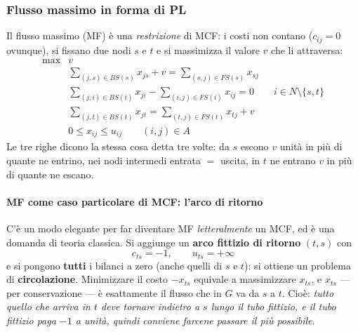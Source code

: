 \documentclass[12pt]{extarticle} %
\begin{document}
\subsubsection{Flusso massimo in forma di PL}
Il flusso massimo (MF) è una \emph{restrizione} di MCF: i costi non contano ($c_{ij}=0$ ovunque), si fissano due nodi $s$ e $t$ e si massimizza il valore $v$ che li attraversa:
\[
\begin{array}{ll}
\max & v \\
     & \displaystyle\sum_{(j,s)\in BS(s)} x_{js} + v = \sum_{(s,j)\in FS(s)} x_{sj} \\[2mm]
     & \displaystyle\sum_{(j,i)\in BS(i)} x_{ji} - \sum_{(i,j)\in FS(i)} x_{ij} = 0 \qquad i \in N \setminus\{s,t\}\\[2mm]
     & \displaystyle\sum_{(j,t)\in BS(t)} x_{jt} = \sum_{(t,j)\in FS(t)} x_{tj} + v \\[2mm]
     & 0 \le x_{ij} \le u_{ij} \qquad (i,j)\in A
\end{array}
\]
Le tre righe dicono la stessa cosa detta tre volte: da $s$ escono $v$ unità in più di quante ne entrino, nei nodi intermedi entrata $=$ uscita, in $t$ ne entrano $v$ in più di quante ne escano.

\paragraph{MF come caso particolare di MCF: l'arco di ritorno}
C'è un modo elegante per far diventare MF \emph{letteralmente} un MCF, ed è una domanda di teoria classica. Si aggiunge un \textbf{arco fittizio di ritorno} $(t,s)$ con
\[
c_{ts} = -1, \qquad u_{ts} = +\infty
\]
e si pongono \textbf{tutti} i bilanci a zero (anche quelli di $s$ e $t$): si ottiene un problema di \textbf{circolazione}. Minimizzare il costo $-x_{ts}$ equivale a massimizzare $x_{ts}$, e $x_{ts}$ --- per conservazione --- è esattamente il flusso che in $G$ va da $s$ a $t$. Cioè: \emph{tutto quello che arriva in $t$ deve tornare indietro a $s$ lungo il tubo fittizio, e il tubo fittizio paga $-1$ a unità, quindi conviene farcene passare il più possibile}.
\begin{center}
\end{center}
\end{document}
